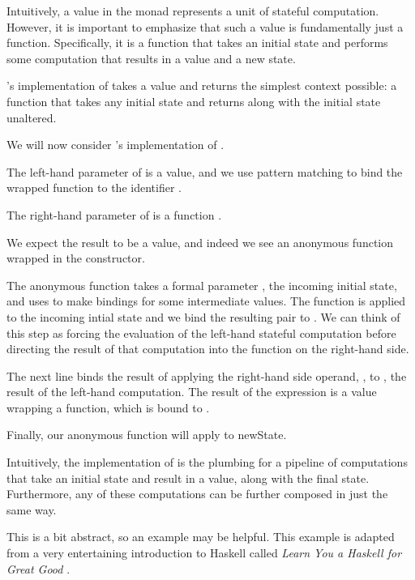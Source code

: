 Intuitively, a value in the  monad represents a unit of stateful computation. However, it is important to
emphasize that such a value is fundamentally just a function. Specifically, it is a function that takes
an initial state and performs some computation that results in a value and a new state.

's implementation of  takes a value  and returns the simplest  context possible:
a function that takes any initial state and returns  along with the initial state unaltered.

We will now consider 's implementation of \code{(>>=)}.

The left-hand parameter of \code{(>>=)} is a  value, and we use pattern matching to bind the wrapped
function to the identifier .

The right-hand parameter of \code{(>>=)} is a function .

We expect the result to be a  value, and indeed we see an anonymous function wrapped in the 
constructor.

The anonymous function takes a formal parameter , the incoming initial state, and uses  to make bindings
for some intermediate values. The function  is applied to the incoming intial state and we bind the resulting pair
to . We can think of this step as forcing the evaluation of the left-hand stateful computation before
directing the result of that computation into the function on the right-hand side.

The next line binds the result of applying the right-hand side operand, , to , the result of the left-hand
computation. The result of the expression  is a  value wrapping a function, which is bound to .

Finally, our anonymous function will apply  to {newState}. 

Intuitively, the  implementation of \code{(>>=)} is the plumbing for a pipeline of computations that take
an initial state and result in a value, along with the final state. Furthermore, any of these  computations
can be further composed in just the same way.

This is a bit abstract, so an example may be helpful. This example is adapted from a very entertaining introduction
to Haskell called \emph{Learn You a Haskell for Great Good} \cite{learnyou}.

